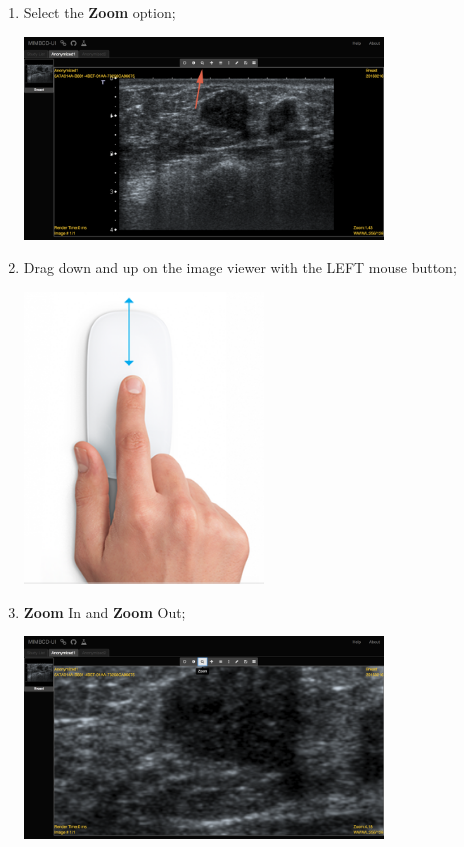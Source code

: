 \documentclass{tufte-book} %
\begin{document}
\begin{enumerate}

\item Select the \textbf{Zoom} option;

\begin{center}
\includegraphics[width=0.75\textwidth]{graphics/anon1_zoom_out.png}
\end{center}

\item Drag down and up on the image viewer with the LEFT mouse button;

\begin{center}
\includegraphics[width=0.50\textwidth]{graphics/mouse-up-down.png}
\end{center}

\item \textbf{Zoom} In and \textbf{Zoom} Out;

\begin{center}
\includegraphics[width=0.75\textwidth]{graphics/anon1_zoom_in.png}
\end{center}

\end{enumerate}
\end{document}
